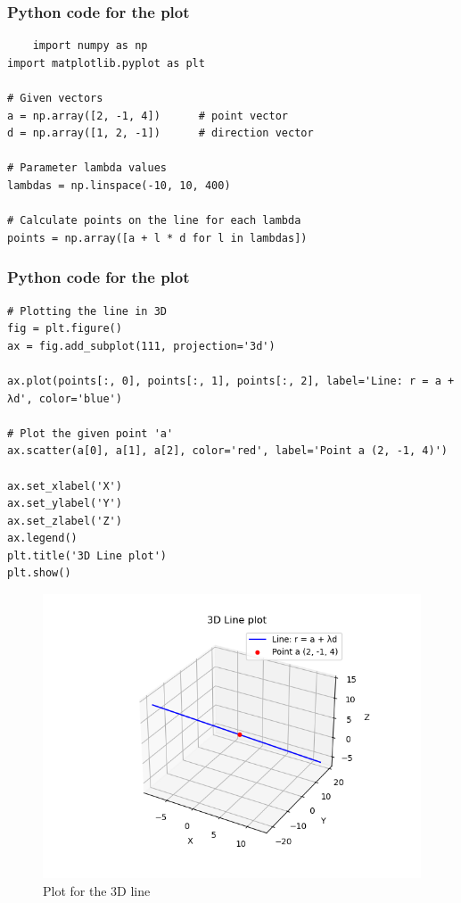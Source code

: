 \documentclass{beamer}
\begin{document}
\begin{frame}[fragile]
     \frametitle{Python code for the plot}
\begin{lstlisting}
    import numpy as np
import matplotlib.pyplot as plt

# Given vectors
a = np.array([2, -1, 4])      # point vector
d = np.array([1, 2, -1])      # direction vector

# Parameter lambda values
lambdas = np.linspace(-10, 10, 400)

# Calculate points on the line for each lambda
points = np.array([a + l * d for l in lambdas])
\end{lstlisting}
\end{frame}
\begin{frame}[fragile]
   \frametitle{Python code for the plot}
    \begin{lstlisting}
# Plotting the line in 3D
fig = plt.figure()
ax = fig.add_subplot(111, projection='3d')

ax.plot(points[:, 0], points[:, 1], points[:, 2], label='Line: r = a + λd', color='blue')

# Plot the given point 'a'
ax.scatter(a[0], a[1], a[2], color='red', label='Point a (2, -1, 4)')

ax.set_xlabel('X')
ax.set_ylabel('Y')
ax.set_zlabel('Z')
ax.legend()
plt.title('3D Line plot')
plt.show()
 \end{lstlisting}
\end{frame}
 \begin{figure}
     \centering
     \includegraphics[width=0.7\linewidth]{figs/fig1.png}
     \caption{Plot for the 3D line}
     \label{fig2}
 \end{figure}
\end{document}
